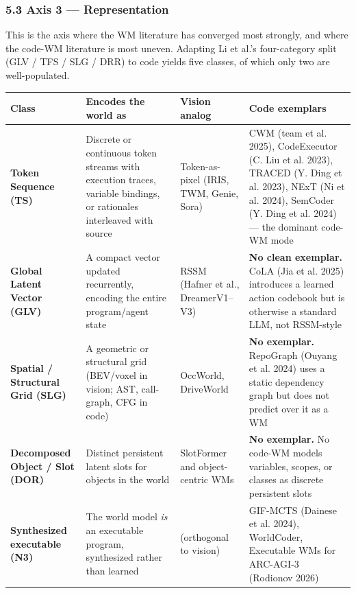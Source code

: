 \documentclass{article}
\begin{document}
\hypertarget{axis-3-representation}{%
\subsubsection{5.3 Axis 3 ---
Representation}\label{axis-3-representation}}

This is the axis where the WM literature has converged most strongly,
and where the code-WM literature is most uneven. Adapting Li et al.'s
four-category split (GLV / TFS / SLG / DRR) to code yields five classes,
of which only two are well-populated.

\begin{longtable}[]{@{}
  >{\raggedright\arraybackslash}p{}
  >{\raggedright\arraybackslash}p{}
  >{\raggedright\arraybackslash}p{}
  >{\raggedright\arraybackslash}p{}@{}}
\toprule
Class & Encodes the world as & Vision analog & Code exemplars \\
\midrule
\endhead
\textbf{Token Sequence (TS)} & Discrete or continuous token streams with
execution traces, variable bindings, or rationales interleaved with
source & Token-as-pixel (IRIS, TWM, Genie, Sora) & CWM (team et al.
2025), CodeExecutor (C. Liu et al. 2023), TRACED (Y. Ding et al. 2023),
NExT (Ni et al. 2024), SemCoder (Y. Ding et al. 2024) --- the dominant
code-WM mode \\
\textbf{Global Latent Vector (GLV)} & A compact vector updated
recurrently, encoding the entire program/agent state & RSSM (Hafner et
al., DreamerV1--V3) & \textbf{No clean exemplar.} CoLA (Jia et al. 2025)
introduces a learned action codebook but is otherwise a standard LLM,
not RSSM-style \\
\textbf{Spatial / Structural Grid (SLG)} & A geometric or structural
grid (BEV/voxel in vision; AST, call-graph, CFG in code) & OccWorld,
DriveWorld & \textbf{No exemplar.} RepoGraph (Ouyang et al. 2024) uses a
static dependency graph but does not predict over it as a WM \\
\textbf{Decomposed Object / Slot (DOR)} & Distinct persistent latent
slots for objects in the world & SlotFormer and object-centric WMs &
\textbf{No exemplar.} No code-WM models variables, scopes, or classes as
discrete persistent slots \\
\textbf{Synthesized executable (N3)} & The world model \emph{is} an
executable program, synthesized rather than learned & (orthogonal to
vision) & GIF-MCTS (Dainese et al. 2024), WorldCoder, Executable WMs for
ARC-AGI-3 (Rodionov 2026) \\
\bottomrule
\end{longtable}
\end{document}
